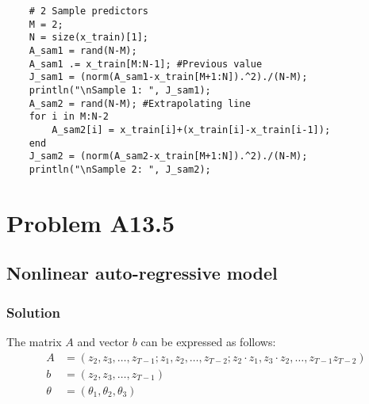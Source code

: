 \documentclass{article}
\begin{document}
\begin{enumerate}[label=\alph*]
\begin{verbatim}
    # 2 Sample predictors
    M = 2;
    N = size(x_train)[1];
    A_sam1 = rand(N-M);
    A_sam1 .= x_train[M:N-1]; #Previous value
    J_sam1 = (norm(A_sam1-x_train[M+1:N]).^2)./(N-M);
    println("\nSample 1: ", J_sam1);
    A_sam2 = rand(N-M); #Extrapolating line
    for i in M:N-2
        A_sam2[i] = x_train[i]+(x_train[i]-x_train[i-1]);
    end
    J_sam2 = (norm(A_sam2-x_train[M+1:N]).^2)./(N-M);
    println("\nSample 2: ", J_sam2);
    \end{verbatim}
\end{enumerate}
\section*{Problem A13.5}
\subsection*{Nonlinear auto-regressive model}
\subsubsection*{Solution}
The matrix $A$ and vector $b$ can be expressed as follows:
\begin{align*}
    A & = (z_2,z_3,\ldots,z_{T-1};z_1,z_2,\ldots,z_{T-2};z_2\cdot z_1, z_3\cdot z_2, \ldots, z_{T-1}z_{T-2})\\
    b & = (z_{2}, z_{3},\ldots, z_{T-1})\\
    \theta & = (\theta_1, \theta_2, \theta_3)
\end{align*}
\end{document}
